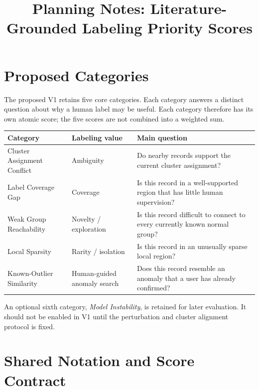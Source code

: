\documentclass[11pt]{article}
\title{Planning Notes: Literature-Grounded Labeling Priority Scores}
\author{}
\date{}
\begin{document}
\maketitle


\section{Proposed Categories}

The proposed V1 retains five core categories. Each category answers a distinct
question about why a human label may be useful. Each category therefore has its
own atomic score; the five scores are not combined into a weighted sum.

\begin{table}[h]
\centering
\small
\begin{tabularx}{\textwidth}{p{} p{} X}
\toprule
Category & Labeling value & Main question \\
\midrule
Cluster Assignment Conflict & Ambiguity &
Do nearby records support the current cluster assignment? \\

Label Coverage Gap & Coverage &
Is this record in a well-supported region that has little human supervision? \\

Weak Group Reachability & Novelty / exploration &
Is this record difficult to connect to every currently known normal group? \\

Local Sparsity & Rarity / isolation &
Is this record in an unusually sparse local region? \\

Known-Outlier Similarity & Human-guided anomaly search &
Does this record resemble an anomaly that a user has already confirmed? \\
\bottomrule
\end{tabularx}
\end{table}

An optional sixth category, \emph{Model Instability}, is retained for later
evaluation. It should not be enabled in V1 until the perturbation and cluster
alignment protocol is fixed.

\section{Shared Notation and Score Contract}
\end{document}

